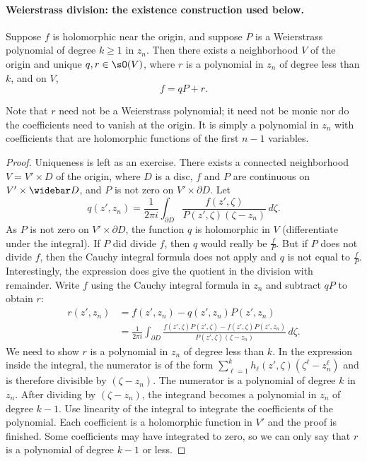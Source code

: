 
\paragraph{Weierstrass division: the existence construction used below.}
\begin{thm}
Suppose $f$ is holomorphic near the origin, and suppose $P$ is a Weierstrass polynomial of degree $k\geq1$ in $z_n$. Then there exists a neighborhood $V$ of the origin and unique $q,r\in\sO(V)$, where $r$ is a polynomial in $z_n$ of degree less than $k$, and on $V$,
\[f=qP+r.\]
\end{thm}
Note that $r$ need not be a Weierstrass polynomial; it need not be monic nor do the coefficients need to vanish at the origin. It is simply a polynomial in $z_n$ with coefficients that are holomorphic functions of the first $n-1$ variables.
\begin{proof}
Uniqueness is left as an exercise. There exists a connected neighborhood $V=V'\times D$ of the origin, where $D$ is a disc, $f$ and $P$ are continuous on $V'\times\widebar D$, and $P$ is not zero on $V'\times\partial D$. Let
\[
q(z',z_n)=\frac1{2\pi i}\int_{\partial D}\frac{f(z',\zeta)}{P(z',\zeta)(\zeta-z_n)}\,d\zeta.
\]
As $P$ is not zero on $V'\times\partial D$, the function $q$ is holomorphic in $V$ (differentiate under the integral). If $P$ did divide $f$, then $q$ would really be $\frac fP$. But if $P$ does not divide $f$, then the Cauchy integral formula does not apply and $q$ is not equal to $\frac fP$. Interestingly, the expression does give the quotient in the division with remainder. Write $f$ using the Cauchy integral formula in $z_n$ and subtract $qP$ to obtain $r$:
\begin{align*}
r(z',z_n)&=f(z',z_n)-q(z',z_n)P(z',z_n)\\
&=\frac1{2\pi i}\int_{\partial D}\frac{f(z',\zeta)P(z',\zeta)-f(z',\zeta)P(z',z_n)}{P(z',\zeta)(\zeta-z_n)}\,d\zeta.
\end{align*}
We need to show $r$ is a polynomial in $z_n$ of degree less than $k$. In the expression inside the integral, the numerator is of the form $\sum_{\ell=1}^k h_\ell(z',\zeta)(\zeta^\ell-z_n^\ell)$ and is therefore divisible by $(\zeta-z_n)$. The numerator is a polynomial of degree $k$ in $z_n$. After dividing by $(\zeta-z_n)$, the integrand becomes a polynomial in $z_n$ of degree $k-1$. Use linearity of the integral to integrate the coefficients of the polynomial. Each coefficient is a holomorphic function in $V'$ and the proof is finished. Some coefficients may have integrated to zero, so we can only say that $r$ is a polynomial of degree $k-1$ or less.
\end{proof}

